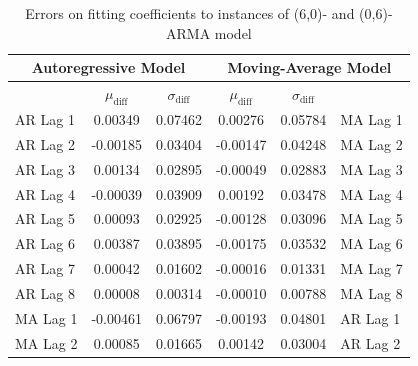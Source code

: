\documentclass[oneside,12pt,openany]{book}
\begin{document}
    \begin{table}[hbt!]
        \centering
        \begin{tabular}{|l|c|c|c|c|l|}
            \hline
            \multicolumn{3}{|c|}{\textbf{Autoregressive Model}}   & \multicolumn{3}{c|}{\textbf{Moving-Average Model}}     \\ \hline
            \cellcolor{black} & $\mu_{\text{diff}}$ & $\sigma_{\text{diff}}$ & $\mu_{\text{diff}}$ & $\sigma_{\text{diff}}$ & \cellcolor{black}         \\ \hline
            AR Lag 1 & 0.00349                  & 0.07462                    & 0.00276                  & 0.05784                    & MA Lag 1 \\ \hline
            AR Lag 2 & -0.00185                 & 0.03404                    & -0.00147                 & 0.04248                    & MA Lag 2 \\ \hline
            AR Lag 3 & 0.00134                  & 0.02895                    & -0.00049                 & 0.02883                    & MA Lag 3 \\ \hline
            AR Lag 4 & -0.00039                 & 0.03909                    & 0.00192                  & 0.03478                    & MA Lag 4 \\ \hline
            AR Lag 5 & 0.00093                  & 0.02925                    & -0.00128                 & 0.03096                    & MA Lag 5 \\ \hline
            AR Lag 6 & 0.00387                  & 0.03895                    & -0.00175                 & 0.03532                    & MA Lag 6 \\ \hline
            AR Lag 7 & 0.00042                  & 0.01602                    & -0.00016                 & 0.01331                    & MA Lag 7 \\ \hline
            AR Lag 8 & 0.00008                   & 0.00314                    & -0.00010                  & 0.00788                    & MA Lag 8 \\ \hline
            MA Lag 1 & -0.00461                 & 0.06797                    & -0.00193                 & 0.04801                    & AR Lag 1 \\ \hline
            MA Lag 2 & 0.00085                  & 0.01665                    & 0.00142                  & 0.03004                    & AR Lag 2 \\ \hline
        \end{tabular}
        \caption{Errors on fitting coefficients to instances of (6,0)- and (0,6)-ARMA model}
        \label{tab:errortsfitting6}
    \end{table}
    \FloatBarrier
    
\end{document}
